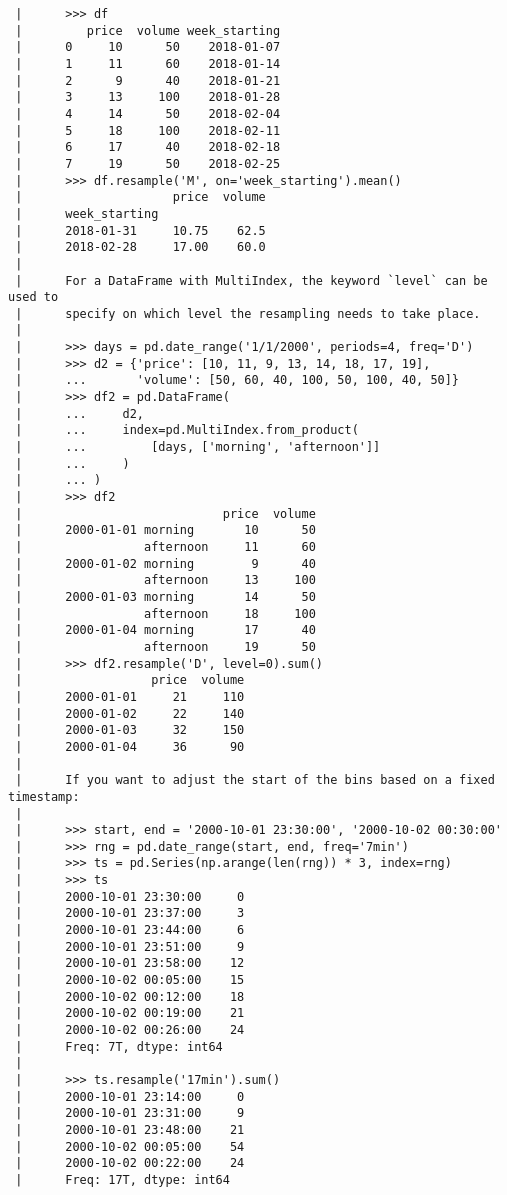 \documentclass[
  letterpaper,
  DIV=11,
  numbers=noendperiod]{scrreprt}
\begin{document}
\begin{verbatim}
 |      >>> df
 |         price  volume week_starting
 |      0     10      50    2018-01-07
 |      1     11      60    2018-01-14
 |      2      9      40    2018-01-21
 |      3     13     100    2018-01-28
 |      4     14      50    2018-02-04
 |      5     18     100    2018-02-11
 |      6     17      40    2018-02-18
 |      7     19      50    2018-02-25
 |      >>> df.resample('M', on='week_starting').mean()
 |                     price  volume
 |      week_starting
 |      2018-01-31     10.75    62.5
 |      2018-02-28     17.00    60.0
 |      
 |      For a DataFrame with MultiIndex, the keyword `level` can be used to
 |      specify on which level the resampling needs to take place.
 |      
 |      >>> days = pd.date_range('1/1/2000', periods=4, freq='D')
 |      >>> d2 = {'price': [10, 11, 9, 13, 14, 18, 17, 19],
 |      ...       'volume': [50, 60, 40, 100, 50, 100, 40, 50]}
 |      >>> df2 = pd.DataFrame(
 |      ...     d2,
 |      ...     index=pd.MultiIndex.from_product(
 |      ...         [days, ['morning', 'afternoon']]
 |      ...     )
 |      ... )
 |      >>> df2
 |                            price  volume
 |      2000-01-01 morning       10      50
 |                 afternoon     11      60
 |      2000-01-02 morning        9      40
 |                 afternoon     13     100
 |      2000-01-03 morning       14      50
 |                 afternoon     18     100
 |      2000-01-04 morning       17      40
 |                 afternoon     19      50
 |      >>> df2.resample('D', level=0).sum()
 |                  price  volume
 |      2000-01-01     21     110
 |      2000-01-02     22     140
 |      2000-01-03     32     150
 |      2000-01-04     36      90
 |      
 |      If you want to adjust the start of the bins based on a fixed timestamp:
 |      
 |      >>> start, end = '2000-10-01 23:30:00', '2000-10-02 00:30:00'
 |      >>> rng = pd.date_range(start, end, freq='7min')
 |      >>> ts = pd.Series(np.arange(len(rng)) * 3, index=rng)
 |      >>> ts
 |      2000-10-01 23:30:00     0
 |      2000-10-01 23:37:00     3
 |      2000-10-01 23:44:00     6
 |      2000-10-01 23:51:00     9
 |      2000-10-01 23:58:00    12
 |      2000-10-02 00:05:00    15
 |      2000-10-02 00:12:00    18
 |      2000-10-02 00:19:00    21
 |      2000-10-02 00:26:00    24
 |      Freq: 7T, dtype: int64
 |      
 |      >>> ts.resample('17min').sum()
 |      2000-10-01 23:14:00     0
 |      2000-10-01 23:31:00     9
 |      2000-10-01 23:48:00    21
 |      2000-10-02 00:05:00    54
 |      2000-10-02 00:22:00    24
 |      Freq: 17T, dtype: int64

\end{verbatim}
\end{document}
